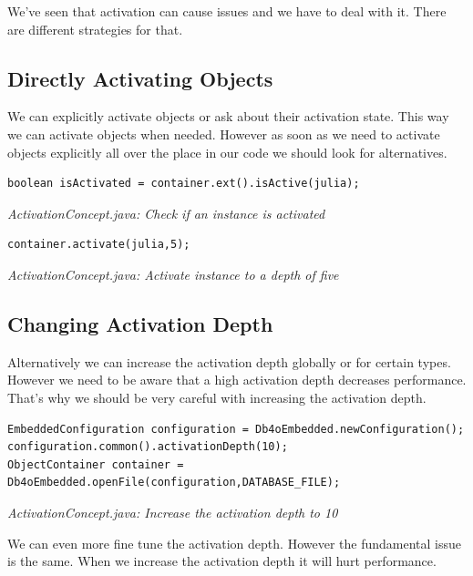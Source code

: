 We've seen that activation can cause issues and we have to deal with it. There are different strategies for that.

\subsection*{Directly Activating Objects}

We can explicitly activate objects or ask about their activation state. This way we can activate objects when needed. However as soon as we need to activate objects explicitly all over the place in our code we should look for alternatives.

\begin{lstlisting}
boolean isActivated = container.ext().isActive(julia);
\end{lstlisting}

{\small\itshape ActivationConcept.java: Check if an instance is activated\par}
\medskip

\begin{lstlisting}
container.activate(julia,5);
\end{lstlisting}

{\small\itshape ActivationConcept.java: Activate instance to a depth of five\par}
\medskip

\subsection*{Changing Activation Depth}

Alternatively we can increase the activation depth globally or for certain types. However we need to be aware that a high activation depth decreases performance. That's why we should be very careful with increasing the activation depth.

\begin{lstlisting}
EmbeddedConfiguration configuration = Db4oEmbedded.newConfiguration();
configuration.common().activationDepth(10);
ObjectContainer container = Db4oEmbedded.openFile(configuration,DATABASE_FILE);
\end{lstlisting}

{\small\itshape ActivationConcept.java: Increase the activation depth to 10\par}
\medskip

We can even more fine tune the activation depth. However the fundamental issue is the same. When we increase the activation depth it will hurt performance.

